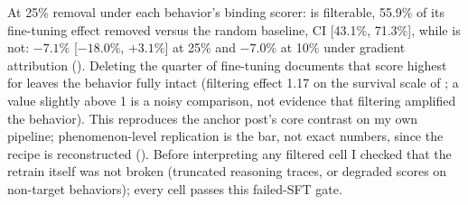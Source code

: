 At 25\% removal under each behavior's binding scorer: 
is filterable, 55.9\% of its fine-tuning effect removed versus the random
baseline, CI [43.1\%, 71.3\%], while  is not:
$-7.1\%$ [$-18.0\%$, $+3.1\%$] at 25\% and $-7.0\%$ at 10\% under
gradient attribution (). Deleting the quarter of
fine-tuning documents that score highest for 
leaves the behavior fully intact (filtering effect 1.17 on the survival
scale of ; a value slightly above 1 is a noisy
comparison, not evidence that filtering amplified the behavior). This
reproduces the anchor post's
core contrast on my own pipeline; phenomenon-level replication is the
bar, not exact numbers, since the recipe is reconstructed
(). Before interpreting any filtered cell I checked
that the retrain itself was not broken (truncated reasoning traces, or
degraded scores on non-target behaviors); every cell passes this
failed-SFT gate.
